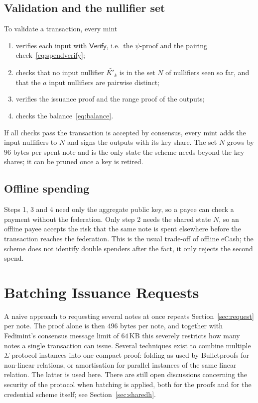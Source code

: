 \documentclass[10pt,a5paper]{article}
\newcommand{\Gt}[1]{\tilde{#1}}             %
\newcommand{\Gt}[1]{{\color{GtwoCol}#1}}    %
\begin{document}
\subsection{Validation and the nullifier set}

To validate a transaction, every mint
\begin{enumerate}[nosep]
  \item verifies each input with $\mathsf{Verify}$, i.e.\ the $\psi$-proof and
        the pairing check~\eqref{eq:spendverify};
  \item checks that no input nullifier $\Gt{K'_k}$ is in the set $N$ of
        nullifiers seen so far, and that the $a$ input nullifiers are pairwise
        distinct;
  \item verifies the issuance proof and the range proof of the outputs;
  \item checks the balance~\eqref{eq:balance}.
\end{enumerate}
If all checks pass the transaction is accepted by consensus, every mint adds
the input nullifiers to $N$ and signs the outputs with its key share. The set
$N$ grows by $96$ bytes per spent note and is the only state the scheme needs
beyond the key shares; it can be pruned once a key is retired.

\subsection{Offline spending}

Steps 1, 3 and 4 need only the aggregate public key, so a payee can check a
payment without the federation. Only step 2 needs the shared state $N$, so an
offline payee accepts the risk that the same note is spent elsewhere before the
transaction reaches the federation. This is the usual trade-off of offline
eCash; the scheme does not identify double spenders after the fact, it only
rejects the second spend.

\section{Batching Issuance Requests}
\label{sec:batching}

A naive approach to requesting several notes at once repeats
Section~\ref{sec:request} per note. The proof alone is then $496$ bytes per
note, and together with Fedimint's consensus message limit of $64$\,KB this
severely restricts how many notes a single transaction can issue. Several
techniques exist to combine multiple $\Sigma$-protocol instances into one
compact proof: folding as used by Bulletproofs for non-linear relations, or
amortisation for parallel instances of the same linear relation. The latter is
used here. There are still open discussions concerning the security of the
protocol when batching is applied, both for the proofs and for the credential
scheme itself; see Section~\ref{sec:sharedh}.
\end{document}
